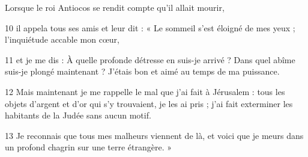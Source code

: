 Lorsque le roi Antiocos se rendit compte qu’il allait mourir,

10 il appela tous ses amis et leur dit : « Le sommeil s’est éloigné de mes yeux ; l’inquiétude accable mon cœur,

11 et je me dis : À quelle profonde détresse en suis-je arrivé ? Dans quel abîme suis-je plongé maintenant ? J’étais bon et aimé au temps de ma puissance.

12 Mais maintenant je me rappelle le mal que j’ai fait à Jérusalem : tous les objets d’argent et d’or qui s’y trouvaient, je les ai pris ; j’ai fait exterminer les habitants de la Judée sans aucun motif.

13 Je reconnais que tous mes malheurs viennent de là, et voici que je meurs dans un profond chagrin sur une terre étrangère. »